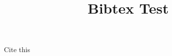 \documentclass[a4paper,10pt]{article}
\title{Bibtex Test}
\begin{document}
Cite this~\cite{testcite}



\end{document}
